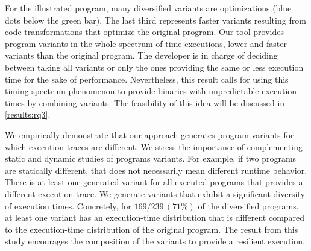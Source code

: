 For the illustrated program, many diversified variants are optimizations (blue dots below the green bar). The last third represents faster variants resulting from code transformations that optimize the original program.
Our tool provides program variants in the whole spectrum of time executions, lower and faster variants than the original program. The developer is in charge of deciding between taking all variants or only the ones providing the same or less execution time for the sake of performance. Nevertheless, this result calls for using this timing spectrum phenomenon to provide binaries with unpredictable execution times by combining variants. The feasibility of this idea will be discussed in \autoref{results:rq3}.


\begin{tcolorbox}[title=Answer to \rqtwo,boxrule=2pt,arc=.3em,boxsep=1.5mm]
    We empirically demonstrate that our approach generates program variants for which execution traces are different. We stress the importance of complementing static and dynamic studies of programs variants. For example, if two programs are statically different, that does not necessarily mean different runtime behavior. There is at least one generated variant for all executed programs that provides a different execution trace. 
    We generate variants that exhibit a significant diversity of execution times. Concretely, for $169/239\,(71\%)$ of the diversified programs, at least one variant has an execution-time distribution that is different compared to the execution-time distribution of the original program. 
    The result from this study encourages the composition of the variants to provide a resilient execution.
\end{tcolorbox}